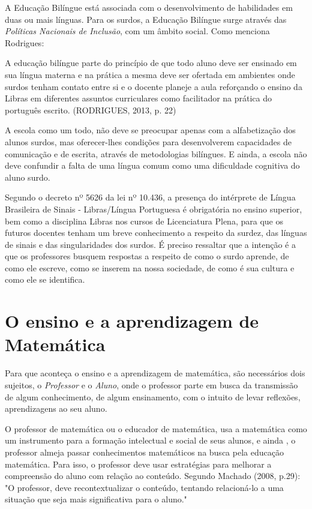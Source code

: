 \documentclass[brasil]{abnt}
\begin{document}
	A Educação Bilíngue está associada com o desenvolvimento de habilidades em duas ou mais línguas. Para os surdos, a Educação Bilíngue surge através das \textit{Políticas Nacionais de Inclusão}, com um âmbito social.
	Como menciona Rodrigues:
	
		\begin{citacao} A educação bilíngue parte do princípio de que todo aluno deve ser ensinado em sua língua materna e na prática a mesma deve ser ofertada em ambientes onde surdos tenham contato entre si e o 
						docente planeje a aula reforçando o ensino da Libras em diferentes assuntos curriculares como facilitador na prática do português escrito. (RODRIGUES, 2013, p. 22) 
		\end{citacao}

	A escola como um todo, não deve se preocupar apenas com a alfabetização dos alunos surdos, mas oferecer-lhes condições para desenvolverem capacidades de comunicação e de escrita, através de 
	metodologias bilíngues.	E ainda, a escola não deve confundir a falta de uma língua comum como uma dificuldade cognitiva do aluno surdo. 
	
	Segundo o decreto nº 5626 da lei nº 10.436, a presença do 
	intérprete de Língua Brasileira de Sinais - Libras/Língua 
	Portuguesa é obrigatória no ensino superior, bem como a disciplina 
	Libras nos cursos de Licenciatura Plena,
	para que os futuros docentes tenham um breve conhecimento a respeito da surdez, das línguas de sinais e das singularidades dos surdos. É preciso ressaltar que a intenção é a que os professores busquem
	respostas a respeito de como o surdo aprende, de como ele escreve, como se inserem na nossa sociedade, de como é sua cultura e como ele se identifica.
	 
											
\chapter{O ensino e a aprendizagem de Matemática}
    Para que aconteça o ensino e a aprendizagem de matemática, são necessários dois sujeitos, o \textit{Professor} e o \textit{Aluno}, onde o professor parte em busca da transmissão de algum conhecimento, 
    de algum ensinamento, com o intuito de levar reflexões, aprendizagens ao seu aluno.
    
    O professor de matemática ou o educador de matemática, usa a matemática como um instrumento para a formação intelectual e social de seus alunos, e ainda , o professor almeja passar conhecimentos 
    matemáticos na busca pela educação matemática. Para isso, o 
    professor deve usar estratégias para melhorar a compreensão do 
    aluno com relação ao conteúdo. Segundo Machado (2008, p.29): "O professor, deve 
    recontextualizar o conteúdo, tentando relacioná-lo a uma situação que seja mais significativa para o aluno."
    
\end{document}
